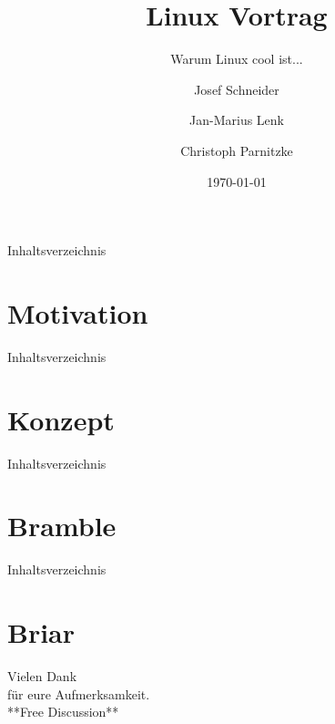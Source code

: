 \documentclass[12pt,utf8]{beamer}
\title{Linux Vortrag}
\subtitle{Warum Linux cool ist...}
\author[J. Schneider]{Josef Schneider}
\author[J.-M. Lenk]{Jan-Marius Lenk}
\author[C. Parnitzke]{Christoph Parnitzke}
\institute[FOSS AG - FbI]{Free and Open Source Software AG\\ Fachbereich Informatik}
\date{\today}
\begin{document}
\begin{frame}
	\titlepage
\end{frame}

\begin{frame}[TU]{Inhaltsverzeichnis}
	\tableofcontents[hideallsubsections]
\end{frame}

\section{Motivation}

\begin{frame}{Inhaltsverzeichnis}
\end{frame}




\section{Konzept}

\begin{frame}{Inhaltsverzeichnis}
\end{frame}




\section{Bramble}

\begin{frame}{Inhaltsverzeichnis}
\end{frame}




\section{Briar}




\begin{frame}
\vfill
\begin{center}\begin{Huge}Vielen Dank \\
für eure Aufmerksamkeit. \\[50pt]
**Free Discussion**\end{Huge}\vfill
\end{center}
\vfill
\end{frame}
\end{document}
